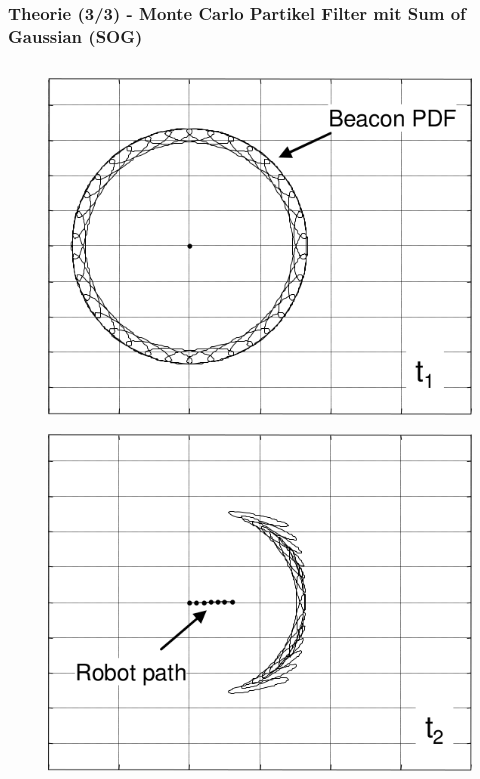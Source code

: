 \documentclass{beamer}
\begin{document}
%
%
\begin{frame}
	\frametitle{Theorie (3/3) - Monte Carlo Partikel Filter mit Sum of Gaussian (SOG)}
	\begin{columns}
			\begin{overlayarea}{\textwidth}{.9\textheight}
				\only<1>
				{
					\begin{figure}
						\centering
						\includegraphics[width=\linewidth]{blanco2008efficient_fig3_1}
						\caption{\cite{blanco2008efficient}}
					\end{figure}
				}
				{
					\begin{figure}
						\centering
						\includegraphics[width=\linewidth]{blanco2008efficient_fig3_2}

\end{figure}}
\end{overlayarea}
\end{columns}
\end{frame}
\end{document}

